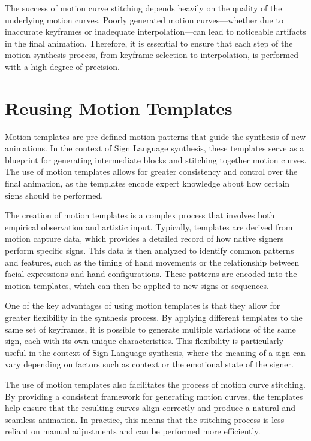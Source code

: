 \documentclass[../../main.tex]{subfiles}
\begin{document}
The success of motion curve stitching depends heavily on the quality of the underlying motion curves. Poorly generated motion curves—whether due to inaccurate keyframes or inadequate interpolation—can lead to noticeable artifacts in the final animation. Therefore, it is essential to ensure that each step of the motion synthesis process, from keyframe selection to interpolation, is performed with a high degree of precision.

\section{Reusing Motion Templates}
\label{sec:reusing_motion_templates}

Motion templates are pre-defined motion patterns that guide the synthesis of new animations. In the context of Sign Language synthesis, these templates serve as a blueprint for generating intermediate blocks and stitching together motion curves. The use of motion templates allows for greater consistency and control over the final animation, as the templates encode expert knowledge about how certain signs should be performed.

The creation of motion templates is a complex process that involves both empirical observation and artistic input. Typically, templates are derived from motion capture data, which provides a detailed record of how native signers perform specific signs. This data is then analyzed to identify common patterns and features, such as the timing of hand movements or the relationship between facial expressions and hand configurations. These patterns are encoded into the motion templates, which can then be applied to new signs or sequences.

One of the key advantages of using motion templates is that they allow for greater flexibility in the synthesis process. By applying different templates to the same set of keyframes, it is possible to generate multiple variations of the same sign, each with its own unique characteristics. This flexibility is particularly useful in the context of Sign Language synthesis, where the meaning of a sign can vary depending on factors such as context or the emotional state of the signer.

The use of motion templates also facilitates the process of motion curve stitching. By providing a consistent framework for generating motion curves, the templates help ensure that the resulting curves align correctly and produce a natural and seamless animation. In practice, this means that the stitching process is less reliant on manual adjustments and can be performed more efficiently.
\end{document}
